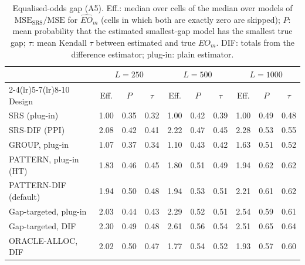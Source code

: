 \documentclass[pdflatex,sn-mathphys-num,iicol]{sn-jnl}
\theoremstyle{thmstyleone}
\theoremstyle{thmstyletwo}
\theoremstyle{thmstylethree}
\begin{document}
\begin{table}[t]
\centering\footnotesize
\setlength{\tabcolsep}{4pt}
\caption{Equalised-odds gap (A5). Eff.: median over cells of the median over models of $\mathrm{MSE}_{\mathrm{SRS}}/\mathrm{MSE}$ for $\widehat{EO}_m$ (cells in which both are exactly zero are skipped); $P$: mean probability that the estimated smallest-gap model has the smallest true gap; $\tau$: mean Kendall $\tau$ between estimated and true $EO_m$. DIF: totals from the difference estimator; plug-in: plain estimator.}
\label{tab:abl-eo}
\begin{tabular}{lccccccccc}
\toprule
 & \multicolumn{3}{c}{$L=250$} & \multicolumn{3}{c}{$L=500$} & \multicolumn{3}{c}{$L=1000$} \\
\cmidrule(lr){2-4}\cmidrule(lr){5-7}\cmidrule(lr){8-10}
Design & Eff. & $P$ & $\tau$ & Eff. & $P$ & $\tau$ & Eff. & $P$ & $\tau$ \\
\midrule
SRS (plug-in) & 1.00 & 0.35 & 0.32 & 1.00 & 0.42 & 0.39 & 1.00 & 0.49 & 0.48 \\
SRS-DIF (PPI) & 2.08 & 0.42 & 0.41 & 2.22 & 0.47 & 0.45 & 2.28 & 0.53 & 0.55 \\
GROUP, plug-in & 1.07 & 0.37 & 0.34 & 1.10 & 0.43 & 0.42 & 1.63 & 0.51 & 0.52 \\
PATTERN, plug-in (HT) & 1.83 & 0.46 & 0.45 & 1.80 & 0.51 & 0.49 & 1.94 & 0.62 & 0.62 \\
PATTERN-DIF (default) & 1.94 & 0.50 & 0.48 & 1.94 & 0.53 & 0.51 & 2.21 & 0.61 & 0.62 \\
Gap-targeted, plug-in & 2.03 & 0.44 & 0.43 & 2.29 & 0.52 & 0.51 & 2.54 & 0.59 & 0.61 \\
Gap-targeted, DIF & 2.30 & 0.49 & 0.48 & 2.61 & 0.56 & 0.54 & 2.51 & 0.65 & 0.64 \\
ORACLE-ALLOC, DIF & 2.02 & 0.50 & 0.47 & 1.77 & 0.54 & 0.52 & 1.93 & 0.57 & 0.60 \\
\bottomrule
\end{tabular}

\end{table}
\end{document}
